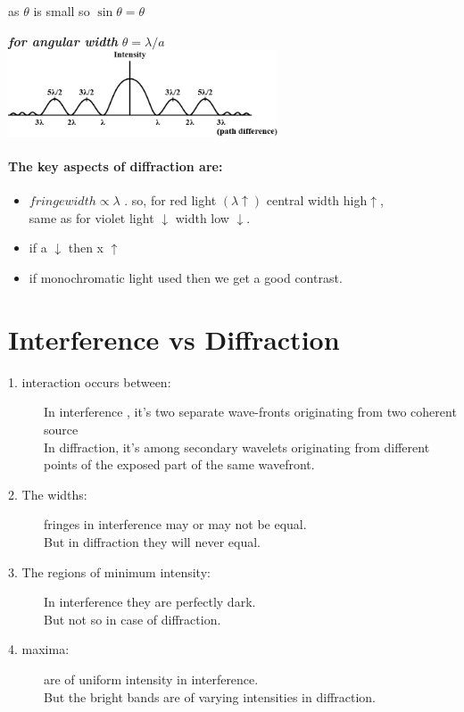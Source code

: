\documentclass[legalpaper,10pt]{article}
\begin{document}
\begin{multicols*}{2}
	as $ \theta $ is small so $ \sin\theta=\theta $

	\textit{\textit{\textbf{for angular width}}} $ \theta=\lambda/a $\\

	\indent\includegraphics[width=8cm]{patt.png}

	\paragraph{\large The key aspects of diffraction are:}
	\begin{itemize}
		\item $ fringewidth \propto \lambda $ . so, for red light $ (\lambda \uparrow) $ central width high$\uparrow$,\\ same as for violet light $\downarrow$ width low $\downarrow$.
		\item if a $\downarrow$ then x $\uparrow$
		\item if monochromatic light used then we get a good contrast.
	\end{itemize}


	\section*{Interference vs Diffraction}
	\begin{description}
		\item[1. interaction occurs between: ]In interference , it's two separate wave-fronts originating from two coherent source\\
		In diffraction, it's among secondary wavelets originating from different points of the exposed part of the same wavefront.
		\item[2. The widths: ] fringes in interference may or may not be equal.\\But in diffraction they will never equal.
		\item[3. The regions of minimum intensity:] In interference they are perfectly dark.\\But not so in case of diffraction.
		\item[4. maxima:] are of uniform intensity in interference.\\ But the bright bands are of varying intensities in diffraction.
	\end{description}


\end{multicols*}
\end{document}
